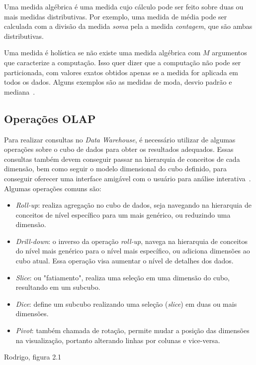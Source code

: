 Uma medida algébrica é uma medida cujo cálculo pode ser feito sobre duas ou mais medidas distributivas.
Por exemplo, uma medida de média pode ser calculada com a divisão da medida \textit{soma} pela a medida \textit{contagem}, que são ambas distributivas.

Uma medida é holística se não existe uma medida algébrica com $M$ argumentos que caracterize a computação.
Isso quer dizer que a computação não pode ser particionada, com valores exatos obtidos apenas se a medida for aplicada em todos os dados.
Alguns exemplos são as medidas de moda, desvio padrão e mediana~\cite{hanDataMiningConcepts2011}.

\subsection{Operações OLAP}
\label{ch:fun:cube:olapops}

Para realizar consultas no \textit{Data Warehouse}, é necessário utilizar de algumas operações sobre o cubo de dados para obter os resultados adequados.
Essas consultas também devem conseguir passar na hierarquia de conceitos de cada dimensão, bem como seguir o modelo dimensional do cubo definido, para conseguir oferecer uma interface amigável com o usuário para análise interativa~\cite{hanDataMiningConcepts2011}.
Algumas operações comuns são:

\begin{itemize}
	\item \textit{Roll-up}: realiza agregação no cubo de dados, seja navegando na hierarquia de conceitos de nível específico para um mais genérico, ou reduzindo uma dimensão.
	\item \textit{Drill-down}: o inverso da operação \textit{roll-up}, navega na hierarquia de conceitos do nível mais genérico para o nível mais específico, ou adiciona dimensões ao cubo atual.
Essa operação visa aumentar o nível de detalhes dos dados.
	\item \textit{Slice}: ou "fatiamento", realiza uma seleção em uma dimensão do cubo, resultando em um subcubo.
	\item \textit{Dice}: define um subcubo realizando uma seleção (\textit{slice}) em duas ou mais dimensões.
	\item \textit{Pivot}: também chamada de rotação, permite mudar a posição das dimensões na visualização, portanto alterando linhas por colunas e vice-versa.
\end{itemize}

{\color{red} Rodrigo, figura 2.1}

